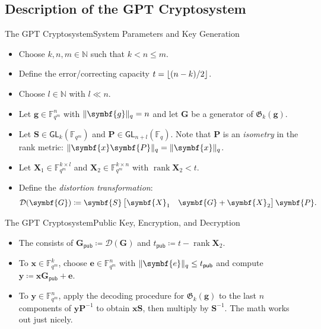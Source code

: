 \documentclass[usepdftitle=false]{beamer}
\renewcommand*{\vec}{\symbf}%
\newcommand*{\mat}{\symbf}%
\DeclareMathOperator{\rank}{rank}%
\newcommand*{\GL}{\ensuremath{\mathsf{GL}}}%
\newcommand*{\pub}{\ensuremath{\mathsf{pub}}}%
\newcommand*{\FF}{\ensuremath{\mathbb{F}}}%
\newcommand*{\NN}{\ensuremath{\mathbb{N}}}%
\newcommand*{\Gab}{\ensuremath{\mathfrak{G}}}%
\DeclarePairedDelimiter{\floor}{\lfloor}{\rfloor}%
\DeclarePairedDelimiter{\norm}{\lVert}{\rVert}%
\newcommand*{\normR}[2]{\ensuremath{\norm{#1}_{#2}}}%
\newcommand*{\Distort}{\mathcal{D}}%
\begin{document}
\subsection{Description of the GPT Cryptosystem}

\begin{frame}{The GPT Cryptosystem}{System Parameters and Key
    Generation}
  \begin{itemize}
  \item Choose \(k, n, m \in \NN\) such that \(k < n \le m\).
  \item Define the error\-/correcting capacity
    \(t = \floor{(n - k) / {2}}\).
  \item Choose \(l \in \NN\) with \(l \ll n\).
  \end{itemize}

  \begin{itemize}
  \item Let \(\vec{g} \in \FF_{q^m}^n\) with
    \(\normR{\vec{g}}{q} = n\) and let \(\mat{G}\) be a generator of
    \(\Gab_k(\vec{g})\).
  \item Let \(\mat{S} \in \GL_k(\FF_{q^m})\) and
    \(\mat{P} \in \GL_{n + l}(\FF_q)\).  Note that \(\mat{P}\) is an
    \emph{isometry} in the rank metric:
    \(\normR{\vec{x} \mat{P}}{q} = \normR{\vec{x}}{q}\).
  \item Let \(\mat{X}_1 \in \FF_{q^m}^{k \times l}\) and
    \(\mat{X}_2 \in \FF_{q^m}^{k \times n}\) with
    \(\rank\mat{X}_2 < t\).
  \item Define the \emph{distortion transformation}:
    \[
      \Distort(\mat{G}) \coloneqq
      \mat{S}
      \begin{bmatrix} \mat{X}_1 & \mat{G} + \mat{X}_2 \end{bmatrix}
      \mat{P}\text.
    \]
  \end{itemize}
\end{frame}

\begin{frame}{The GPT Cryptosystem}{Public Key, Encryption, and Decryption}
  \begin{itemize}
  \item The  consists of
    \(\mat{G}_{\pub} \coloneqq \Distort(\mat{G})\) and
    \(t_{\pub} \coloneqq t - \rank\mat{X}_2\).
  \item To  \(\vec{x} \in \FF_{q^m}^k\), choose
    \(\vec{e} \in \FF_{q^m}^n\) with
    \(\normR{\vec{e}}{q} \le t_{\pub}\) and compute
    \(\vec{y} \coloneqq \vec{x} \mat{G}_{\pub} + \vec{e}\).
  \item To  \(\vec{y} \in \FF_{q^m}^n\), apply the
    decoding procedure for \(\Gab_k(\vec{g})\) to the last \(n\)
    components of \(\vec{y} \mat{P}^{-1}\) to obtain
    \(\vec{x} \mat{S}\), then multiply by \(\mat{S}^{-1}\).
    \alert{The math works out just nicely}.
  \end{itemize}
\end{frame}
\end{document}
